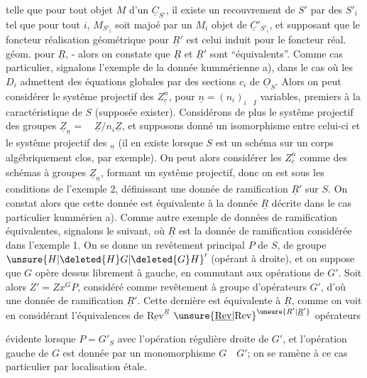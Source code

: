 telle que pour tout objet $M$ d'un $\underline{C}_{S'}$, il existe un recouvrement de $S'$ par des $S'_i$ tel que pour tout $i$, $M_{S'_i}$ soit  majoé par un $M_i$ objet de $\underline{C}'_{S'_i}$,  et supposant que le foncteur réalisation géométrique pour $\underline{R}'$ est celui induit pour le foncteur réal. géom. pour $\underline{R}$, - alors on constate que $\underline{R}$ et $\underline{R}'$ sont ``équivalents''. Comme cas particulier, signalons l'exemple de la donnée kummérienne a), dans le cas où les $D_i$ admettent des équations globales par des sections $c_i$ de $\underline{O}_S$. Alors on peut considérer le systême projectif des $Z_{\underline{c}}^{\underline{n}}$, pour $\underline{n}=(n_i)_{i\quad I}$ variables, premiers  à la caractéristique de $S$ (supposée exister). Considérons de plus le systême projectif des groupes $\underline{Z}_{\underline{n}}=\quad\underline{Z}/n_i\underline{Z}$, et supposons donné un isomorphisme entre celui-ci et le systême projectif des ${}_{\underline{n}}$ (il en existe lorsque $S$ est un schéma sur un corps algébriquement clos, par exemple). On peut alors considérer les $Z_{\underline{c}}^{\underline{n}}$ comme des schémas à groupes $\underline{Z}_{\underline{n}}$, formant un systême projectif,  donc on est sous les conditions de l'exemple 2, définissant une donnée de ramification $\underline{R}'$ sur $S$. On constat alors que cette donnée est équivalente à la donnée $\underline{R}$ décrite dans le cas particulier kummérien a). Comme autre exemple de données de ramification équivalentes, signalons le suivant, où $\underline{R}$ est la donnée de ramification considérée dans l'exemple 1. On se donne un revêtement principal $P$ de $S$, de groupe $\unsure{H|\deleted{H}G|\deleted{G}H}'$ (opérant à droite), et on suppose que $G$ opère dessus librement à gauche, en commutant aux opérations de $G'$. Soit alors $Z'=Zx^{G}P$, considéré comme revêtement à groupe d'opérateurs $G'$, d'où une donnée de ramification $\underline{R}'$. Cette dernière est équivalente à $\underline{R}$, comme on voit en considérant l'équivalences  de   $\underline{\mathrm{Rev}}^{\underline{R}}$  ${\unsure{\underline{\mathrm{Rev}}|\mathrm{Rev}}}^{\unsure{R'|\underline{R}'}}$ opérateurs 

évidente lorsque $P=G'_S$ avec l'opération régulière droite de $G'$, et l'opération gauche de $G$ est donnée par un monomorphisme $G\quad G'$; on se ramène à ce cas particulier par localisation étale.

